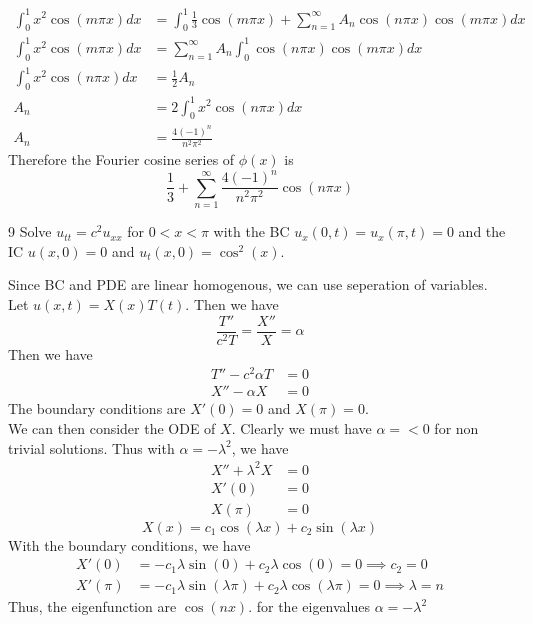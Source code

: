 \documentclass[answers,12pt,addpoints]{exam}
\begin{document}
\begin{questions}
\begin{solution}
\begin{align*}
            \int_{0}^{1} x^2 \cos(m \pi x) dx &= \int_{0}^{1} \frac{1}{3}\cos(m \pi x) + \sum_{n=1}^{\infty} A_n \cos(n\pi x) \cos(m\pi x) dx \\
            \int_{0}^{1} x^2 \cos(m \pi x) dx &= \sum_{n=1}^{\infty} A_n \int_{0}^{1} \cos(n\pi x) \cos(m\pi x) dx \\
            \int_{0}^{1} x^2 \cos(n \pi x) dx &= \frac{1}{2} A_n \\
            A_n &= 2 \int_{0}^{1} x^2 \cos(n\pi x) dx\\
            A_n &= \frac{4(-1)^n}{n^2 \pi^2}
        \end{align*}
        Therefore the Fourier cosine series of $\phi(x)$ is
        \[ \frac{1}{3} + \sum_{n=1}^{\infty} \frac{4(-1)^n}{n^2 \pi^2} \cos(n\pi x) \]
    \end{solution}
     9
    Solve $u_{tt} = c^2 u_{xx}$ for $0 < x < \pi$ with the BC $u_x(0,t) = u_x(\pi,t) = 0$ and the IC $u(x,0) = 0$ and $u_t(x,0) = \cos^2(x)$.
    \begin{solution}
        Since BC and PDE are linear homogenous, we can use seperation of variables. Let $u(x,t) = X(x)T(t)$. Then we have
        \[ \frac{T''}{c^2T} = \frac{X''}{X} = \alpha \]
        Then we have
        \begin{align*}
            T'' - c^2\alpha T &= 0 \\
            X'' - \alpha X &= 0
        \end{align*}
        The boundary conditions are $X'(0) = 0$ and $X(\pi) = 0$. \\
        We can then consider the ODE of $X$. Clearly we must have $\alpha =< 0 $ for non trivial solutions. Thus with $\alpha = -\lambda^2$, we have
        \begin{align*}
            X'' + \lambda^2 X &= 0 \\
            X'(0) &= 0 \\
            X(\pi) &= 0
        \end{align*}
        \[ X(x) = c_1 \cos(\lambda x) + c_2 \sin(\lambda x) \]
        With the boundary conditions, we have
        \begin{align*}
            X'(0) &= -c_1\lambda\sin(0) + c_2\lambda\cos(0) = 0 \implies c_2 = 0 \\
            X'(\pi) &= -c_1\lambda\sin(\lambda \pi) + c_2\lambda\cos(\lambda \pi) = 0 \implies \lambda = n
        \end{align*}
        Thus, the eigenfunction are $ \cos(n x) $. for the eigenvalues $\alpha = -\lambda^2 $\\

\end{solution}
\end{questions}
\end{document}

